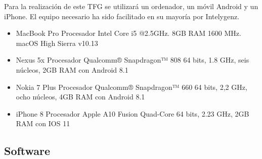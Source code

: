 Para la realización de este TFG se utilizará un ordenador, un móvil Android y un iPhone. El equipo 
necesario ha sido facilitado en su mayoría por Intelygenz.

\begin{itemize}
	\item MacBook Pro Procesador Intel Core i5 @2.5GHz. 8GB RAM 1600 MHz. macOS High Sierra v10.13
	\item Nexus 5x Procesador Qualcomm® Snapdragon™ 808 64 bits, 1.8 GHz, seis núcleos, 2GB RAM con Android 8.1
	\item Nokia 7 Plus Procesador Qualcomm® Snapdragon™ 660 64 bits, 2,2 GHz, ocho núcleos, 4GB RAM con Android 8.1
	\item iPhone 8 Procesador Apple A10 Fusion Quad-Core 64 bits, 2.23 GHz, 2GB RAM con IOS 11
\end{itemize}

\subsection{Software}

